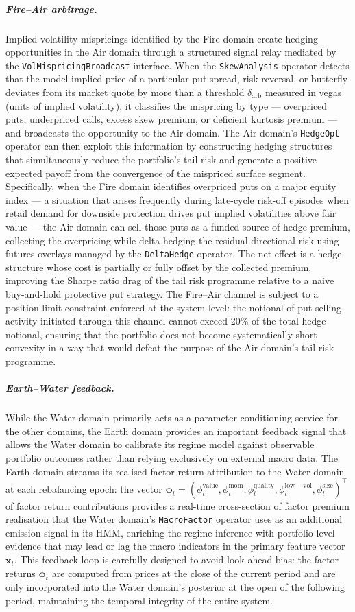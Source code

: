 \documentclass[12pt,openany]{book}
\numberwithin{equation}{chapter}
\theoremstyle{plain}
\theoremstyle{definition}
\theoremstyle{remark}
\begin{document}
\subparagraph{Fire--Air arbitrage.}
Implied volatility mispricings identified by the Fire domain create hedging opportunities in the Air domain through a structured signal relay mediated by the \texttt{VolMispricingBroadcast} interface. When the \texttt{SkewAnalysis} operator detects that the model-implied price of a particular put spread, risk reversal, or butterfly deviates from its market quote by more than a threshold $\delta_{\mathrm{arb}}$ measured in vegas (units of implied volatility), it classifies the mispricing by type — overpriced puts, underpriced calls, excess skew premium, or deficient kurtosis premium — and broadcasts the opportunity to the Air domain. The Air domain's \texttt{HedgeOpt} operator can then exploit this information by constructing hedging structures that simultaneously reduce the portfolio's tail risk and generate a positive expected payoff from the convergence of the mispriced surface segment. Specifically, when the Fire domain identifies overpriced puts on a major equity index — a situation that arises frequently during late-cycle risk-off episodes when retail demand for downside protection drives put implied volatilities above fair value — the Air domain can sell those puts as a funded source of hedge premium, collecting the overpricing while delta-hedging the residual directional risk using futures overlays managed by the \texttt{DeltaHedge} operator. The net effect is a hedge structure whose cost is partially or fully offset by the collected premium, improving the Sharpe ratio drag of the tail risk programme relative to a naive buy-and-hold protective put strategy. The Fire--Air channel is subject to a position-limit constraint enforced at the system level: the notional of put-selling activity initiated through this channel cannot exceed 20\% of the total hedge notional, ensuring that the portfolio does not become systematically short convexity in a way that would defeat the purpose of the Air domain's tail risk programme.

\subparagraph{Earth--Water feedback.}
While the Water domain primarily acts as a parameter-conditioning service for the other domains, the Earth domain provides an important feedback signal that allows the Water domain to calibrate its regime model against observable portfolio outcomes rather than relying exclusively on external macro data. The Earth domain streams its realised factor return attribution to the Water domain at each rebalancing epoch: the vector $\boldsymbol{\phi}_t = (\phi_t^{\mathrm{value}}, \phi_t^{\mathrm{mom}}, \phi_t^{\mathrm{quality}}, \phi_t^{\mathrm{low-vol}}, \phi_t^{\mathrm{size}})^\top$ of factor return contributions provides a real-time cross-section of factor premium realisation that the Water domain's \texttt{MacroFactor} operator uses as an additional emission signal in its HMM, enriching the regime inference with portfolio-level evidence that may lead or lag the macro indicators in the primary feature vector $\mathbf{x}_t$. This feedback loop is carefully designed to avoid look-ahead bias: the factor returns $\boldsymbol{\phi}_t$ are computed from prices at the close of the current period and are only incorporated into the Water domain's posterior at the open of the following period, maintaining the temporal integrity of the entire system.
\end{document}
